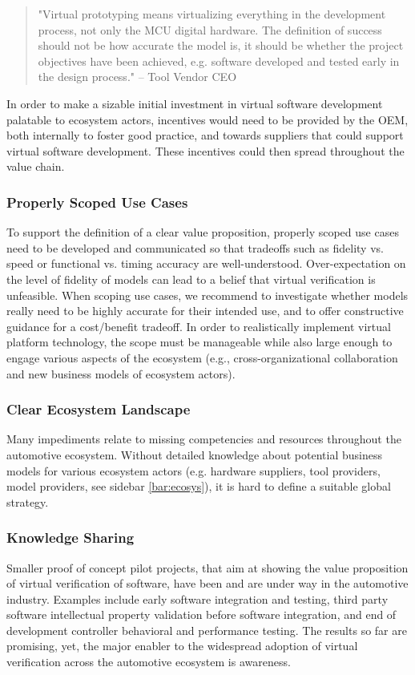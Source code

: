 \begin{quote}
"Virtual prototyping means virtualizing everything in the development process, not only the MCU digital hardware.
The definition of success should not be how accurate the model is,
it should be whether the project objectives have been achieved, e.g. software developed and tested early in the design process."
-- Tool Vendor CEO
\end{quote}

In order to make a sizable initial investment in virtual software development palatable to ecosystem actors,
incentives would need to be provided by the OEM,
both internally to foster good practice, and towards suppliers that could support virtual software development.
These incentives could then spread throughout the value chain.

\subsubsection*{Properly Scoped Use Cases}
To support the definition of a clear value proposition,
properly scoped use cases need to be {developed and} communicated so that tradeoffs such as fidelity vs. speed or functional vs. timing accuracy are well-understood.
Over-expectation on the level of fidelity of models %
can lead to a belief that virtual verification is unfeasible.
When scoping use cases, we recommend to  
investigate whether models really need to be highly accurate for their intended use, and to offer constructive guidance for a cost/benefit tradeoff.
In order to realistically implement virtual platform technology,
the scope must be manageable while also large enough to engage various aspects of the ecosystem
(e.g., cross-organizational collaboration and new business models of ecosystem actors).

\subsubsection*{Clear Ecosystem Landscape}
Many impediments relate to missing competencies and resources throughout the automotive ecosystem. 
Without detailed knowledge about potential business models for various ecosystem actors (e.g. hardware suppliers, tool providers, model providers, see sidebar \ref{bar:ecosys}), it is hard to define a suitable global strategy. 

\subsubsection*{Knowledge Sharing}
Smaller proof of concept pilot projects, that aim at showing the value proposition of virtual verification of software, have been and are under way in the automotive industry.
Examples include early software integration and testing, third party software intellectual property validation before software integration, and end of development controller behavioral and performance testing.
The results so far are promising, yet, the major enabler to the widespread adoption of virtual verification across the automotive ecosystem is awareness.

